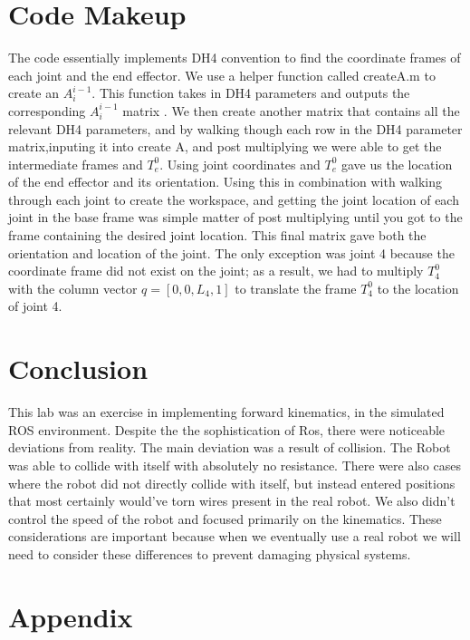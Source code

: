 \documentclass[12pt]{article}
\begin{document}
\section{Code Makeup}
\par{ The code essentially implements DH4 convention to find the coordinate frames of each joint and the end effector. We use a helper function called createA.m to create an $A^{i-1}_{i}$. This function takes in DH4 parameters and outputs the corresponding $A^{i-1}_{i}$ matrix . We then create another matrix that contains all the relevant DH4 parameters, and by walking though each row in the DH4 parameter matrix,inputing it into create A, and post multiplying we were able to get the intermediate frames and $T^{0}_{e}$. Using joint coordinates and $T^{0}_{e}$ gave us the location of the end effector and its orientation. Using this in combination with walking through each joint to create the workspace, and getting the joint location of each joint in the base frame was simple matter of post multiplying until you got to the frame containing the desired joint location. This final matrix gave both the orientation and location of the joint. The only exception was joint 4 because the coordinate frame did not exist on the joint; as a result, we had to multiply $T^{0}_{4}$ with the column vector $q=[0,0,L_{4},1]$ to translate the frame $T^{0}_{4}$  to the location of joint 4.
}

\section{Conclusion}
\par{This lab was an exercise in implementing forward kinematics, in the simulated ROS environment. Despite the the sophistication of Ros, there were noticeable deviations from reality. The main deviation was a result of collision. The Robot was able to collide with itself with absolutely no resistance. There were also cases where the robot did not directly collide with itself, but instead entered positions that most certainly would've torn wires present in the real robot. We also didn't control the speed of the robot and focused primarily on the kinematics. These considerations are important because when we eventually use a real robot we will need to consider these differences to prevent damaging physical systems.
}
\section{Appendix}

	

	

\end{document}
